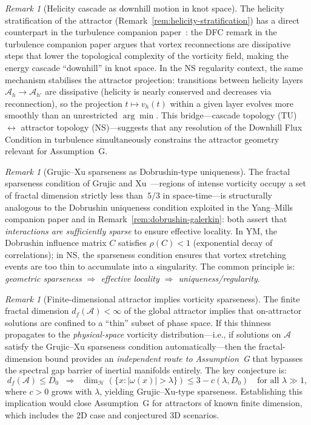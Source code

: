 \documentclass[12pt,a4paper]{article}
\theoremstyle{definition}
\theoremstyle{plain}
\theoremstyle{remark}
\newtheorem{remark}[definition]{Remark}
\begin{document}
\begin{remark}[Helicity cascade as downhill motion in knot space]
\label{rem:helicity-cascade-bridge}
The helicity stratification of the attractor
(Remark~\ref{rem:helicity-stratification}) has a direct counterpart in
the turbulence companion paper~\cite{FST-TU2026}: the DFC remark in the turbulence companion paper
argues that vortex reconnections are dissipative steps that lower the
topological complexity of the vorticity field, making the energy cascade
``downhill'' in knot space. In the NS regularity context, the same
mechanism stabilises the attractor projection: transitions between
helicity layers $\mathcal{A}_h \to \mathcal{A}_{h'}$ are dissipative
(helicity is nearly conserved and decreases via reconnection), so the
projection $t \mapsto v_h(t)$ within a given layer evolves more
smoothly than an unrestricted $\arg\min$.  This bridge---cascade
topology (TU) $\leftrightarrow$ attractor topology (NS)---suggests
that any resolution of the Downhill Flux Condition in turbulence
simultaneously constrains the attractor geometry relevant for
Assumption~G\@.
\end{remark}

\begin{remark}[Grujic--Xu sparseness as Dobrushin-type uniqueness]
\label{rem:sparseness-dobrushin}
The fractal sparseness condition of Grujic and
Xu~\cite{GrujicXu2025}---regions of intense vorticity occupy a set of
fractal dimension strictly less than~$5/3$ in space-time---is
structurally analogous to the Dobrushin uniqueness condition exploited
in the Yang--Mills companion paper and in
Remark~\ref{rem:dobrushin-galerkin}: both assert that \emph{interactions
are sufficiently sparse} to ensure effective locality.  In YM, the
Dobrushin influence matrix $C$ satisfies $\rho(C) < 1$ (exponential
decay of correlations); in NS, the sparseness condition ensures that
vortex stretching events are too thin to accumulate into a singularity.
The common principle is: \emph{geometric sparseness $\Rightarrow$
effective locality $\Rightarrow$ uniqueness/regularity}.
\end{remark}

\begin{remark}[Finite-dimensional attractor implies vorticity sparseness]
\label{rem:attractor-sparseness}
The finite fractal dimension $d_f(\mathcal{A}) < \infty$ of the global
attractor implies that on-attractor solutions are confined to a
``thin'' subset of phase space. If this thinness propagates to the
\emph{physical-space} vorticity distribution---i.e., if solutions on
$\mathcal{A}$ satisfy the Grujic--Xu sparseness condition
automatically---then the fractal-dimension bound provides an
\emph{independent route to Assumption~G} that bypasses the spectral gap
barrier of inertial manifolds entirely.  The key conjecture is:
\[
  d_f(\mathcal{A}) \leq D_0
  \;\;\Longrightarrow\;\;
  \dim_{\mathcal{H}}(\{x : |\omega(x)| > \lambda\})
  \leq 3 - c(\lambda, D_0)
  \quad\text{for all } \lambda \gg 1,
\]
where $c > 0$ grows with $\lambda$, yielding Grujic--Xu-type sparseness.
Establishing this implication would close Assumption~G for attractors of
known finite dimension, which includes the 2D case and conjectured
3D scenarios.
\end{remark}
\end{document}
